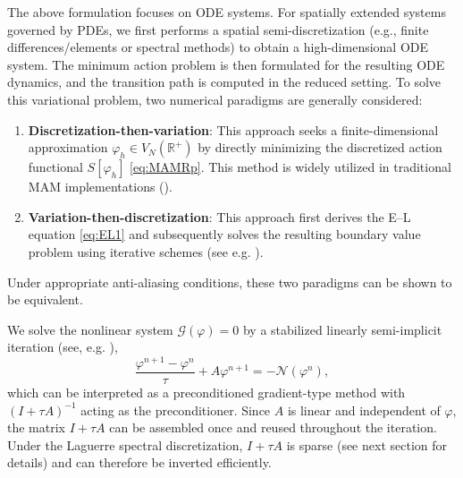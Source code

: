 \documentclass[a4paper,fleqn, 12pt]{cas-sc}
\numberwithin{table}{section}
\begin{document}
The above formulation focuses on ODE systems. For spatially extended systems governed by PDEs, we first performs a spatial semi-discretization  (e.g., finite differences/elements or spectral methods) to obtain a high-dimensional ODE system. The minimum action problem is then formulated for the resulting ODE dynamics, and the transition path is computed in the reduced setting. To solve this variational problem, two numerical paradigms are generally considered:
\begin{enumerate}
    \item \textbf{Discretization-then-variation}: This approach seeks a finite-dimensional approximation $\varphi_h \in V_N(\mathbb{R}^+)$ by directly minimizing the discretized action functional $S[\varphi_h]$ \eqref{eq:MAMRp}. This method is widely utilized in traditional MAM implementations (\cite{e_minimum_2004,wan_dynamic_2017}).
    \item \textbf{Variation-then-discretization}: This approach first derives the E--L equation \eqref{eq:EL1} and subsequently solves the resulting boundary value problem using iterative schemes (see e.g. \cite{heymann_geometric_2008}).
\end{enumerate}
Under appropriate anti-aliasing conditions, these two paradigms can be shown to be equivalent.

We solve the nonlinear system $\mathcal{G}(\varphi)=0$ by a stabilized linearly semi-implicit iteration (see, e.g. \cite{saad2003iterative,shen_numerical_2010, WangYu2018EfficientSecond}),
\begin{equation}\label{eq:semiimplicit}
\frac{\varphi^{n+1}-\varphi^{n}}{\tau}+ {A} \varphi^{n+1}=- \mathcal{N} (\varphi^{n}),
\end{equation}
which can be interpreted as a preconditioned gradient-type method with $(I+\tau A)^{-1}$ acting as the preconditioner. Since $A$ is linear and independent of $\varphi$, the matrix $I+\tau A$ can be assembled once and reused throughout the iteration. Under the Laguerre spectral discretization, $I+\tau A$ is sparse (see next section for details) and can therefore be inverted efficiently.
\end{document}
